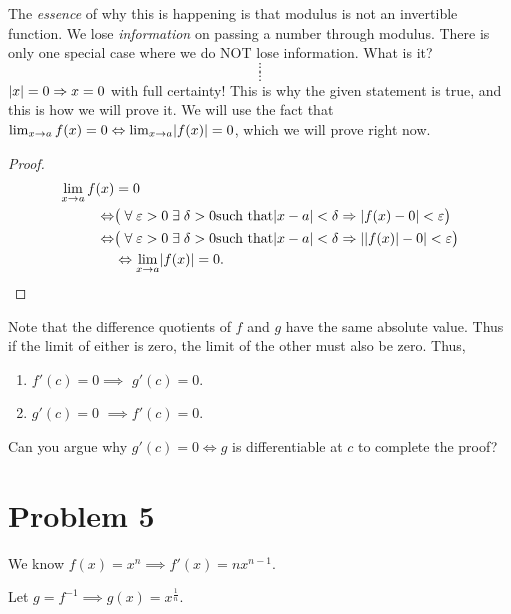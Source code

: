 \documentclass[12pt]{article}
\begin{document}
The \emph{essence} of why this is happening is that modulus is not an invertible function. We lose \emph{information} on passing a number through modulus. There is only one special case where we do NOT lose information. What is it? \[
    \vdots
\] \[
    \vdots
\] $\abs{x} = 0 \implies x = 0$ with full certainty!  This is why the given statement is true, and this is how we will prove it. 
We will use the fact that $\lim_{x \to a} f(x) = 0 \iff \lim_{x \to a} \abs{f(x)} = 0$, which we will prove right now.
\begin{proof}
    \begin{align*}
        \lim_{x \to a} f(x) &= 0 \\
        \iff &\big(\;\forall\; \varepsilon > 0 \;\exists\; \delta > 0 \text{such that} \abs{x - a} < \delta \implies \abs{f(x) - 0} < \varepsilon \big) \\
        \iff &\big(\;\forall\; \varepsilon > 0 \;\exists\; \delta > 0 \text{such that} \abs{x - a} < \delta \implies \abs{\abs{f(x)} - 0} < \varepsilon \big) \\
        &\iff \lim_{x \to a} \abs{f(x)} = 0. \qedhere
    \end{align*}
\end{proof}

Note that the difference quotients of $f$ and $g$ have the same absolute value. Thus if the limit of either is zero, the limit of the other must also be zero.
Thus,
\begin{enumerate}[label=(\roman*)]
    \item $f'(c) = 0 \implies$ \textcolor{red!80!black}{$g'(c) = 0$}.
    \item \textcolor{red!80!black}{$g'(c) = 0$} $\implies f'(c) = 0$.
\end{enumerate}
Can you argue why $g'(c) = 0 \iff g$ is differentiable at $c$ to complete the proof?

\section*{Problem 5}
We know $f(x) = x^{n} \implies f'(x) = n x^{n-1}$.

Let $g = f^{-1} \implies g(x) = x^{\frac{1}{n}}$.
\end{document}
